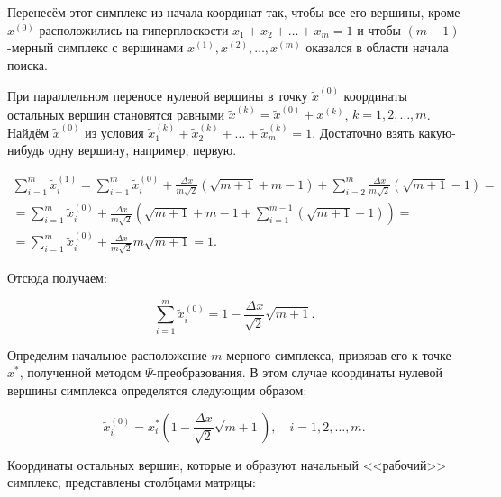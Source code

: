 Перенесём этот симплекс из начала координат так, чтобы все его вершины, кроме $x^{(0)}$ расположились на гиперплоскости $x_1+x_2+\dots+x_m=1$ и чтобы $(m-1)$-мерный симплекс с вершинами $x^{(1)},x^{(2)},\dots,x^{(m)}$ оказался в области начала поиска. 



При параллельном переносе нулевой вершины в точку $\tilde{x}^{(0)}$ координаты остальных вершин становятся равными $\tilde{x}^{(k)}=\tilde{x}^{(0)}+x^{(k)}$, $k=1,2,\dots,m$. Найдём $\tilde{x}^{(0)}$ из условия $\tilde{x}_1^{(k)}+\tilde{x}_2^{(k)}+\dots+\tilde{x}_m^{(k)}=1$. Достаточно взять какую-нибудь одну вершину, например, первую. 

\begin{multline}

\sum\limits_{i=1}^m\tilde{x}_i^{(1)}=\sum\limits_{i=1}^m\tilde{x}_i^{(0)}+\frac{\Delta x}{m\sqrt2}(\sqrt{m+1}+m-1)+\sum\limits_{i=2}^m\frac{\Delta x}{m\sqrt2}(\sqrt{m+1}-1)= 

\\

=\sum\limits_{i=1}^m\tilde{x}_i^{(0)}+\frac{\Delta x}{m\sqrt2}\left(\sqrt{m+1}+m-1+\sum\limits_{i=1}^{m-1}(\sqrt{m+1}-1)\right)=

\\

=\sum\limits_{i=1}^m\tilde{x}_i^{(0)}+\frac{\Delta x}{m\sqrt2}m\sqrt{m+1}=1.

\end{multline}



Отсюда получаем: 

$$

\sum\limits_{i=1}^m\tilde{x}_i^{(0)}=1-\frac{\Delta x}{\sqrt2}\sqrt{m+1}.

$$



Определим начальное расположение $m$-мерного симплекса, привязав его к точке $x^\ast$, полученной методом $\Psi$-преобразования. В этом случае координаты нулевой вершины симплекса определятся следующим образом:

$$

\tilde{x}_i^{(0)}=x_i^\ast\left(1-\frac{\Delta x}{\sqrt 2}\sqrt{m+1}\right), \quad i=1,2,\dots,m.

$$



Координаты остальных вершин, которые и образуют начальный <<рабочий>> симплекс, представлены столбцами матрицы:


